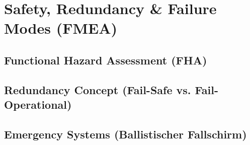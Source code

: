 ﻿\chapter{Safety, Redundancy \& Failure Modes (FMEA)}
\label{ch:safety}
\section{Functional Hazard Assessment (FHA)}
\section{Redundancy Concept (Fail-Safe vs. Fail-Operational)}
\section{Emergency Systems (Ballistischer Fallschirm)}
